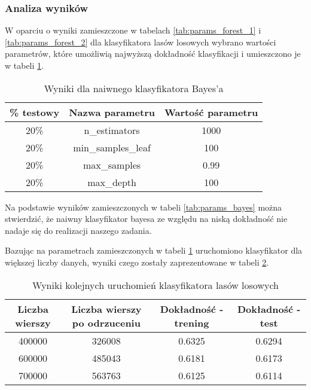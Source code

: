 \documentclass{classrep}
\begin{document}
{{            \subsubsection{Analiza wyników} {
                W oparciu o wyniki zamieszczone w tabelach \ref{tab:params_forest_1} i \ref{tab:params_forest_2} dla
                klasyfikatora lasów losowych wybrano wartości parametrów, które umożliwią najwyższą dokładność
                klasyfikacji i umieszczono je w tabeli \ref{tab:params_forest_final}.

                \begin{table}[!htbp]
                    \begin{tabular}{|c|c|c|}
                        \hline
                        \% testowy & Nazwa parametru & Wartość parametru \\ \hline
                        20\% & n\_estimators & 1000 \\ \hline
                        20\% & min\_samples\_leaf & 100 \\ \hline
                        20\% & max\_samples & 0.99 \\ \hline
                        20\% & max\_depth & 100 \\ \hline
                    \end{tabular}
                    \caption{Wyniki dla naiwnego klasyfikatora Bayes'a}
                    \label{tab:params_forest_final}
                \end{table}
                \FloatBarrier

                Na podstawie wyników zamieszczonych w tabeli \ref{tab:params_bayes} można stwierdzić, że naiwny
                klasyfikator bayesa ze względu na niską dokładność nie nadaje się do realizacji naszego zadania.

                Bazując na parametrach zamieszczonych w tabeli \ref{tab:params_forest_final} uruchomiono klasyfikator
                dla większej liczby danych, wyniki czego zostały zaprezentowane w tabeli \ref{tab:forest_exec}.

                \begin{table}[!htbp]
                    \begin{tabular}{|c|c|c|c|}
                        \hline
                        Liczba wierszy & Liczba wierszy po odrzuceniu & Dokładność - trening & Dokładność - test \\ \hline
                        400000 & 326008 & 0.6325 & 0.6294 \\ \hline
                        600000 & 485043 & 0.6181 & 0.6173 \\ \hline
                        700000 & 563763 & 0.6125 & 0.6114 \\ \hline
                    \end{tabular}
                    \caption{Wyniki kolejnych uruchomień klasyfikatora lasów losowych}
                    \label{tab:forest_exec}
                \end{table}
                \FloatBarrier

}}}
\end{document}

